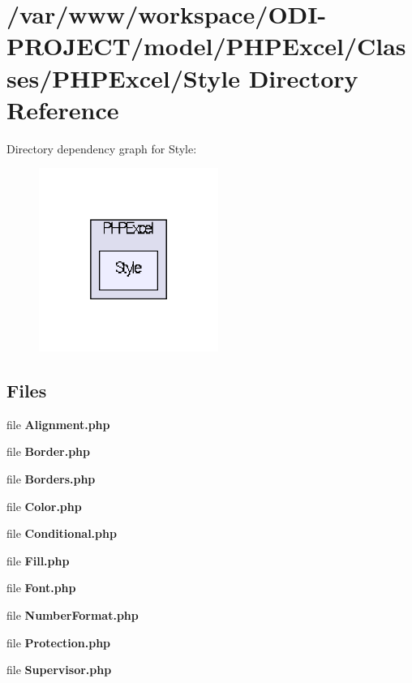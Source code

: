 \section{/var/www/workspace/\+O\+D\+I-\/\+P\+R\+O\+J\+E\+C\+T/model/\+P\+H\+P\+Excel/\+Classes/\+P\+H\+P\+Excel/\+Style Directory Reference}
\label{dir_6a9a295734947775237b3f2342ee681c}
Directory dependency graph for Style\+:\nopagebreak
\begin{figure}[H]
\begin{center}
\leavevmode
\includegraphics[width=166pt]{dir_6a9a295734947775237b3f2342ee681c_dep}
\end{center}
\end{figure}
\subsection*{Files}
\begin{DoxyCompactItemize}
\item 
file {\bfseries Alignment.\+php}
\item 
file {\bfseries Border.\+php}
\item 
file {\bfseries Borders.\+php}
\item 
file {\bfseries Color.\+php}
\item 
file {\bfseries Conditional.\+php}
\item 
file {\bfseries Fill.\+php}
\item 
file {\bfseries Font.\+php}
\item 
file {\bfseries Number\+Format.\+php}
\item 
file {\bfseries Protection.\+php}
\item 
file {\bfseries Supervisor.\+php}
\end{DoxyCompactItemize}

